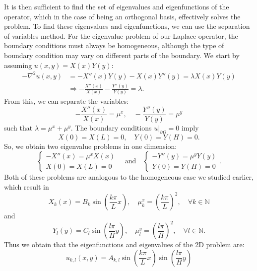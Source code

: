 It is then sufficient to find the set of eigenvalues and eigenfunctions of the operator, which in the case of being an orthogonal basis, effectively solves the problem. To find these eigenvalues and eigenfunctions, we can use the separation of variables method. For the eigenvalue problem of our Laplace operator, the boundary conditions must always be homogeneous, although the type of boundary condition may vary on different parts of the boundary. We start by assuming $u(x,y)=X(x)Y(y)$:
\begin{align*}
    -\nabla^{2}u(x,y)&=-X''(x)Y(y)-X(x)Y''(y)=\lambda X(x)Y(y) \\
    &\Rightarrow-\frac{X''(x)}{X(x)}-\frac{Y''(y)}{Y(y)}=\lambda.
\end{align*}
From this, we can separate the variables:
\begin{equation*}
    -\frac{X''(x)}{X(x)} = \mu^x, \quad -\frac{Y''(y)}{Y(y)} = \mu^y
\end{equation*}
such that $\lambda = \mu^x + \mu^y$.  The boundary conditions $u|_{\partial\Omega}=0$ imply
\begin{equation*}
    X(0)=X(L)=0, \quad Y(0)=Y(H)=0.
\end{equation*}
So, we obtain two eigenvalue problems in one dimension: 
\begin{equation*}
    \begin{cases}-X''(x)=\mu^{x}X(x)\\ X(0)=X(L)=0\end{cases} \quad \text{and} \quad \begin{cases}-Y''(y)=\mu^{y}Y(y)\\ Y(0)=Y(H)=0\end{cases}.
\end{equation*}
Both of these problems are analogous to the homogeneous case we studied earlier, which result in
\begin{equation*}
    X_{k}(x)=B_{k}\sin\left(\frac{k\pi}{L}x\right), \quad \mu_{k}^{x}=\left(\frac{k\pi}{L}\right)^{2}, \quad \forall k\in\mathbb{N}
\end{equation*}
and
\begin{equation*}
    Y_{l}(y)=C_{l}\sin\left(\frac{l\pi}{H}y\right), \quad \mu_{l}^{y}=\left(\frac{l\pi}{H}\right)^{2}, \quad \forall l\in\mathbb{N}.
\end{equation*}
Thus we obtain that the eigenfunctions and eigenvalues of the 2D problem are:
\begin{equation*}
    u_{k,l}(x,y)=A_{k,l} \sin\left(\frac{k\pi}{L}x\right)\sin\left(\frac{l\pi}{H}y\right)
\end{equation*}
